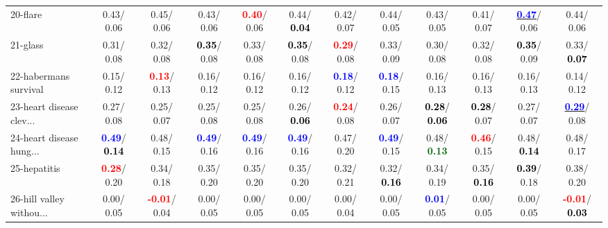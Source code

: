 \begin{table}[h]
\begin{center}
{\begin{tabular}{lc|c|c|c|c|c|c|c|c|c|c}
20-flare &   0.43/  0.06 &   0.45/  0.06 &   0.43/  0.06 & \textcolor{red}{\textbf{  0.40}}/  0.06 &   0.44/\textcolor{black}{\textbf{  0.04}} &   0.42/  0.07 &   0.44/  0.05 &   0.43/  0.05 &   0.41/  0.07 & \underline{\textcolor{blue}{\textbf{  0.47}}}/  0.06 &   0.44/  0.06 \\
21-glass &   0.31/  0.08 &   0.32/  0.08 & \textcolor{black}{\textbf{  0.35}}/  0.08 &   0.33/  0.08 & \textcolor{black}{\textbf{  0.35}}/  0.08 & \textcolor{red}{\textbf{  0.29}}/  0.08 &   0.33/  0.09 &   0.30/  0.08 &   0.32/  0.08 & \textcolor{black}{\textbf{  0.35}}/  0.09 &   0.33/\textcolor{black}{\textbf{  0.07}} \\ \hline
22-habermans survival &   0.15/  0.12 & \textcolor{red}{\textbf{  0.13}}/  0.13 &   0.16/  0.12 &   0.16/  0.12 &   0.16/  0.12 & \textcolor{blue}{\textbf{  0.18}}/  0.12 & \textcolor{blue}{\textbf{  0.18}}/  0.15 &   0.16/  0.13 &   0.16/  0.13 &   0.16/  0.13 &   0.14/  0.12 \\
23-heart disease clev... &   0.27/  0.08 &   0.25/  0.07 &   0.25/  0.08 &   0.25/  0.08 &   0.26/\textcolor{black}{\textbf{  0.06}} & \textcolor{red}{\textbf{  0.24}}/  0.08 &   0.26/  0.07 & \textcolor{black}{\textbf{  0.28}}/\textcolor{black}{\textbf{  0.06}} & \textcolor{black}{\textbf{  0.28}}/  0.07 &   0.27/  0.07 & \underline{\textcolor{blue}{\textbf{  0.29}}}/  0.08 \\
24-heart disease hung... & \textcolor{blue}{\textbf{  0.49}}/\textcolor{black}{\textbf{  0.14}} &   0.48/  0.15 & \textcolor{blue}{\textbf{  0.49}}/  0.16 & \textcolor{blue}{\textbf{  0.49}}/  0.16 & \textcolor{blue}{\textbf{  0.49}}/  0.16 &   0.47/  0.20 & \textcolor{blue}{\textbf{  0.49}}/  0.15 &   0.48/\textcolor{darkgreen}{\textbf{  0.13}} & \textcolor{red}{\textbf{  0.46}}/  0.15 &   0.48/\textcolor{black}{\textbf{  0.14}} &   0.48/  0.17 \\
25-hepatitis & \textcolor{red}{\textbf{  0.28}}/  0.20 &   0.34/  0.18 &   0.35/  0.20 &   0.35/  0.20 &   0.35/  0.20 &   0.32/  0.21 &   0.32/\textcolor{black}{\textbf{  0.16}} &   0.34/  0.19 &   0.35/\textcolor{black}{\textbf{  0.16}} & \textcolor{black}{\textbf{  0.39}}/  0.18 &   0.38/  0.20 \\
26-hill valley withou... &   0.00/  0.05 & \textcolor{red}{\textbf{ -0.01}}/  0.04 &   0.00/  0.05 &   0.00/  0.05 &   0.00/  0.05 &   0.00/  0.04 &   0.00/  0.05 & \textcolor{blue}{\textbf{  0.01}}/  0.05 &   0.00/  0.05 &   0.00/  0.05 & \textcolor{red}{\textbf{ -0.01}}/\textcolor{black}{\textbf{  0.03}} \\

\end{tabular}}
\end{center}
\end{table}

